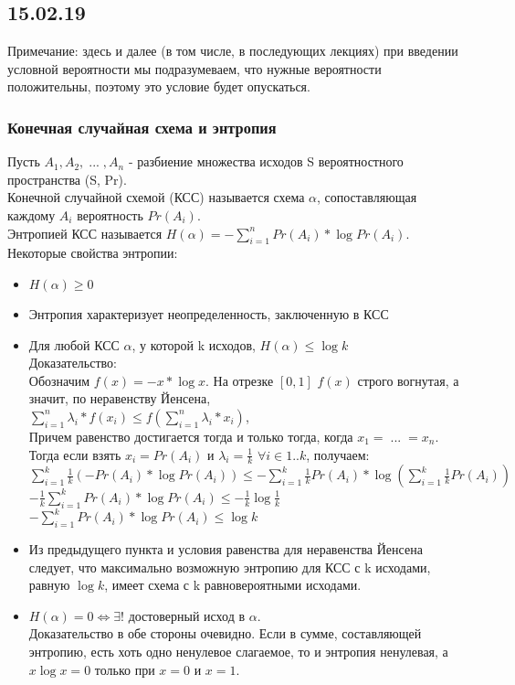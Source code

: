 \subsection{15.02.19}
Примечание: здесь и далее (в том числе, в последующих лекциях) при введении условной вероятности мы подразумеваем, что нужные вероятности положительны, поэтому это условие будет опускаться.
\subsubsection{Конечная случайная схема и энтропия}
Пусть $A_1, A_2, \; ... \; , A_n$ - разбиение множества исходов S вероятностного пространства (S, Pr). \\
Конечной случайной схемой (КСС) называется схема $\alpha$, сопоставляющая каждому $A_i$ вероятность $Pr(A_i)$.\\
Энтропией КСС называется $H(\alpha) = -\sum\limits_{i = 1}^n Pr(A_i) * \log Pr(A_i)$.\\
Некоторые свойства энтропии:\\
\begin{itemize}
\item $H(\alpha) \geq 0$\\
\item Энтропия характеризует неопределенность, заключенную в КСС\\
\item Для любой КСС $\alpha$, у которой k исходов, $H(\alpha) \leq \log k$\\
Доказательство:\\
Обозначим $f(x) = -x * \log x$. На отрезке $[0, 1]$ $f(x)$ строго вогнутая, а значит, по неравенству Йенсена,\\
$\sum\limits_{i = 1}^n \lambda_i * f(x_i) \leq f(\sum\limits_{i = 1}^n \lambda_i * x_i)$, \\
Причем равенство достигается тогда и только тогда, когда $x_1 = \; ... \; = x_n$.\\
Тогда если взять $x_i = Pr(A_i)$ и $\lambda_i = \frac{1}{k}$ $\forall i \in 1..k$, получаем:\\
$\sum\limits_{i = 1}^k \frac{1}{k}(-Pr(A_i) * \log Pr(A_i)) \leq -\sum\limits_{i = 1}^k \frac{1}{k}Pr(A_i) * \log (\sum\limits_{i = 1}^k \frac{1}{k}Pr(A_i))$\\
$-\frac{1}{k} \sum\limits_{i = 1}^k Pr(A_i) * \log Pr(A_i) \leq -\frac{1}{k} \log\frac{1}{k}$\\
$-\sum\limits_{i = 1}^k Pr(A_i) * \log Pr(A_i) \leq \log k$\\
\item Из предыдущего пункта и условия равенства для неравенства Йенсена следует, что максимально возможную энтропию для КСС с k исходами, равную $\log k$, имеет схема с k равновероятными исходами.\\
\item $H(\alpha) = 0 \Leftrightarrow \exists!$ достоверный исход в $\alpha$. \\
Доказательство в обе стороны очевидно. Если в сумме, составляющей энтропию, есть хоть одно ненулевое слагаемое, то и энтропия ненулевая, а $x \log x = 0$ только при $x = 0$ и $x = 1$.
\end{itemize}
